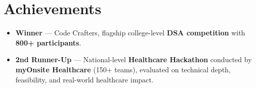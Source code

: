 \documentclass[letterpaper,11pt]{article}
\newcommand{\resumeSubHeadingListStart}{\begin{itemize}[leftmargin=0in,label={}]}
\newcommand{\resumeSubHeadingListEnd}{\end{itemize}}
\begin{document}
\section{Achievements}
\resumeSubHeadingListStart
\item \small{\textbf{Winner} — Code Crafters, flagship college-level \textbf{DSA competition} with \textbf{800+ participants}.}
\item \small{\textbf{2nd Runner-Up} — National-level \textbf{Healthcare Hackathon} conducted by \textbf{myOnsite Healthcare} (150+ teams), evaluated on technical depth, feasibility, and real-world healthcare impact.}
\resumeSubHeadingListEnd
\end{document}
